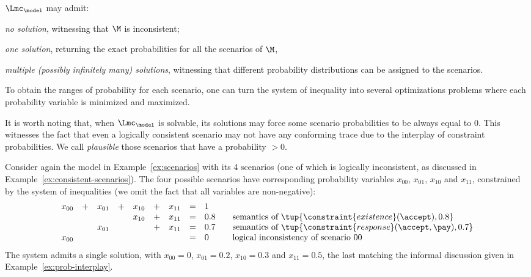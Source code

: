 $\Lmc_\model$ may admit:
\begin{inparaenum}[\it (i)]
\item \emph{no solution}, witnessing that $\M$ is inconsistent;
\item \emph{one solution}, returning the exact probabilities for all the scenarios of $\M$,
\item \emph{multiple (possibly infinitely many) solutions}, witnessing that different probability distributions can be assigned to the scenarios.
\end{inparaenum} To obtain the ranges of probability for each scenario, one can turn the system of inequality into several optimizations problems where each probability variable is minimized and maximized.

It is worth noting that, when $\Lmc_\model$ is solvable, its solutions may force some scenario probabilities to be always equal to $0$. This witnesses the fact that even a logically consistent scenario may not have any conforming trace due to the interplay of constraint probabilities. We call \emph{plausible} those scenarios that have a probability $>0$.

\begin{example}
  Consider again the \pdeclare model in Example~\ref{ex:scenarios} with its 4 scenarios (one of which is logically inconsistent, as discussed in Example~\ref{ex:consistent-scenarios}). The four possible scenarios have corresponding probability variables $x_{00}$,  $x_{01}$, $x_{10}$ and $x_{11}$, constrained by the system of inequalities (we omit the fact that all variables are non-negative):
  $$
  \begin{array}{lclclclcl@{\qquad}l}
  x_{00} &+& x_{01} &+& x_{10} &+& x_{11} &=& 1 &
  \\
         & &        & & x_{10} &+& x_{11} &=& 0.8 &
  \text{semantics of $\tup{\constraint{existence}(\accept),0.8}$}
  \\
         & & x_{01} & &  &+&  x_{11}      &=& 0.7 &
  \text{semantics of $\tup{\constraint{response}(\accept,\pay),0.7}$}
  \\
  x_{00} & &       & &        & &         &=& 0 &
  \text{logical inconsistency of scenario $00$}
  \end{array}
  $$
The system admits a single solution, with $x_{00} = 0$, $x_{01} = 0.2$, $x_{10} = 0.3$ and $x_{11} = 0.5$, the last matching the informal discussion given in Example~\ref{ex:prob-interplay}.
\end{example}

